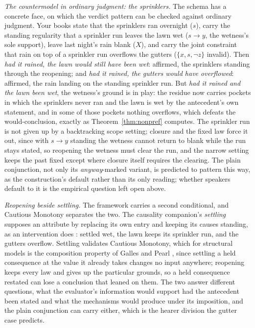 \textit{The countermodel in ordinary judgment: the sprinklers.} The schema has a concrete face, on which the verdict pattern can be checked against ordinary judgment. Your books state that the sprinklers ran overnight ($s$), carry the standing regularity that a sprinkler run leaves the lawn wet ($s \rightarrow y$, the wetness's sole support), leave last night's rain blank ($X$), and carry the joint constraint that rain on top of a sprinkler run overflows the gutters ($\{x, s, \neg z\}$ invalid). Then \emph{had it rained, the lawn would still have been wet}: affirmed, the sprinklers standing through the reopening; and \emph{had it rained, the gutters would have overflowed}: affirmed, the rain landing on the standing sprinkler run. But \emph{had it rained and the lawn been wet}, the wetness's ground is in play: the residue now carries pockets in which the sprinklers never ran and the lawn is wet by the antecedent's own statement, and in some of those pockets nothing overflows, which defeats the would-conclusion, exactly as Theorem~\ref{thm:nonpref} computes. The sprinkler run is not given up by a backtracking scope setting; closure and the fixed law force it out, since with $s \rightarrow y$ standing the wetness cannot return to blank while the run stays stated, so reopening the wetness must clear the run, and the narrow setting keeps the past fixed except where closure itself requires the clearing. The plain conjunction, not only its \emph{anyway}-marked variant, is predicted to pattern this way, as the construction's default rather than its only reading; whether speakers default to it is the empirical question left open above.

\noindent\textit{Reopening beside settling.} The framework carries a second conditional, and Cautious Monotony separates the two. The causality companion's \emph{settling} \parencite{AethusCausality} supposes an attribute by replacing its own entry and keeping its causes standing, as an intervention does \parencite{pearl2009}: settled wet, the lawn keeps its sprinkler run, and the gutters overflow. Settling validates Cautious Monotony, which for structural models is the composition property of Galles and Pearl \parencite*{galles1998axiomatic}, since settling a held consequence at the value it already takes changes no input anywhere; reopening keeps every law and gives up the particular grounds, so a held consequence restated can lose a conclusion that leaned on them. The two answer different questions, what the evaluator's information would support had the antecedent been stated and what the mechanisms would produce under its imposition, and the plain conjunction can carry either, which is the hearer division the gutter case predicts.


